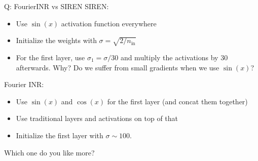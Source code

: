 \documentclass[10pt, handout]{beamer}
\begin{document}
%

\begin{frame}{Q: FourierINR vs SIREN}
\pause
SIREN:
\begin{itemize}
    \item\pause Use $\sin(x)$ activation function everywhere
    \item\pause Initialize the weights with $\sigma = \sqrt{2/n_\text{in}}$
    \item\pause For the first layer, use $\sigma_1 = \sigma / 30$ and multiply the activations by 30 afterwards. Why? Do we suffer from small gradients when we use $\sin(x)$?
\end{itemize}

\pause 
Fourier INR:
\begin{itemize}
    \item\pause Use $\sin(x)$ and $\cos(x)$ for the first layer (and concat them together)
    \item\pause Use traditional layers and activations on top of that
    \item\pause Initialize the first layer with $\sigma \sim 100$.
\end{itemize}

Which one do you like more?
\end{frame}


\end{document}
